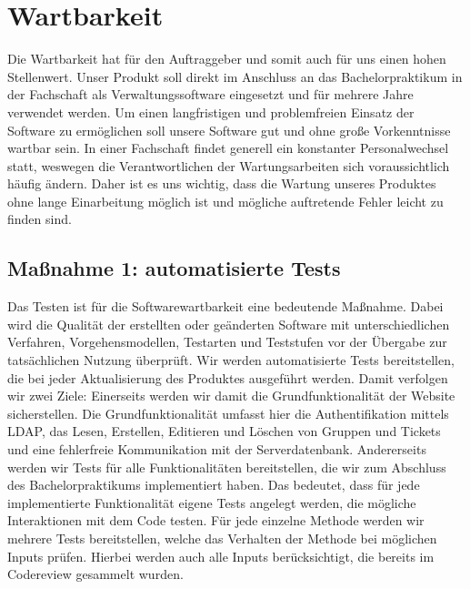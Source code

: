 \documentclass[accentcolor=tud0b,12pt,paper=a4]{tudreport}
\begin{document}
        \section{Wartbarkeit}
Die Wartbarkeit hat für den Auftraggeber und somit auch für uns einen hohen Stellenwert. Unser Produkt soll direkt im Anschluss an das Bachelorpraktikum in der Fachschaft als Verwaltungssoftware eingesetzt und für mehrere Jahre verwendet werden. Um einen langfristigen und problemfreien Einsatz der Software zu ermöglichen soll unsere Software gut und ohne große Vorkenntnisse wartbar sein. In einer Fachschaft findet generell ein konstanter Personalwechsel statt, weswegen die Verantwortlichen der Wartungsarbeiten sich voraussichtlich häufig ändern.
Daher ist es uns wichtig, dass die Wartung unseres Produktes ohne lange Einarbeitung möglich ist und mögliche auftretende Fehler leicht zu finden sind.

\subsection{Maßnahme 1: automatisierte Tests}
Das Testen ist für die Softwarewartbarkeit  eine bedeutende Maßnahme.  Dabei wird die Qualität der erstellten oder geänderten Software mit unterschiedlichen Verfahren, Vorgehensmodellen, Testarten und Teststufen vor der Übergabe zur tatsächlichen Nutzung überprüft. Wir werden  automatisierte Tests bereitstellen, die bei jeder Aktualisierung des Produktes ausgeführt werden. Damit verfolgen wir zwei Ziele: Einerseits werden wir damit die Grundfunktionalität der Website sicherstellen. Die Grundfunktionalität umfasst hier die Authentifikation mittels LDAP, das Lesen, Erstellen, Editieren und Löschen von Gruppen und Tickets und eine fehlerfreie Kommunikation mit der Serverdatenbank. Andererseits werden wir Tests für alle Funktionalitäten bereitstellen, die wir zum Abschluss des Bachelorpraktikums implementiert haben. Das bedeutet, dass für jede implementierte Funktionalität eigene Tests angelegt werden, die mögliche Interaktionen mit dem Code testen. Für jede einzelne Methode werden wir mehrere Tests bereitstellen, welche das Verhalten der Methode bei möglichen Inputs prüfen. Hierbei werden auch alle Inputs berücksichtigt, die bereits im Codereview gesammelt wurden.\\
\end{document}
